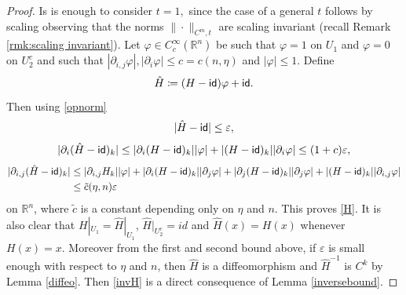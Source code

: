 \documentclass[11pt]{article}
\newcommand{\eps}{\varepsilon}
\newcommand{\rr}{\mathbb{R}}
\newcommand{\id}{{\sf id}}
\renewcommand{\phi}{\varphi}
\theoremstyle{plain}
\theoremstyle{definition}
\numberwithin{equation}{section}
\begin{document}
\begin{proof}
		Is is enough to  consider $t=1,$ since the case of a general $t$ follows by scaling observing that the norms $\|\cdot\|_{C^m,t}$ are scaling invariant (recall Remark \ref{rmk:scaling invariant}).
	Let  $\phi \in C_c^{\infty}(\rr^n)$ be such that $\phi=1 $ on $U_1$ and $\phi=0$ on $U_2^c$ and such that $|\partial_{i,j}\phi|,|\partial_i\phi |\le c=c(n,\eta)$ and $|\phi|\le 1$. Define 
	\[\hat H\coloneqq  (H-{\sf{id}})\phi+\id. \]
	Then using \eqref{opnorm}
	$$|\hat H-\id|\le \eps, $$
	$$|\partial_i(\hat H-{\sf{id}})_k|\le |\partial_i (H-{\sf{id}})_k||\phi|+|(H-{\sf{id}})_k| |\partial_i \phi  |\le (1+c) \eps, $$
	\begin{align*}
		|\partial_{i,j}(\hat H-{\sf{id}})_k|&\le  |\partial_{i,j} H_k||\phi|+|\partial_{i}(H-{\sf{id}})_k||\partial_j\phi |+|\partial_{j}(H-{\sf{id}})_k||\partial_j\phi |+|(H-{\sf{id}})_k||\partial_{i,j} \phi|\\
		&\le \tilde c(\eta,n) \eps 
	\end{align*}
	on $\rr^n$, where $\tilde c$ is a constant depending only on $\eta$ and $n$. This proves \eqref{H}. It is also clear that $H|_{U_1}=\hat H|_{U_1}$, $\hat H|_{U_2^c}=id$ and $\hat H(x)=H(x)$ whenever $H(x)=x$. Moreover from the first and second bound above, if $\eps$ is small enough with respect to $\eta$ and $n$, then $\hat H$ is a diffeomorphism and $\hat H^{-1}$ is $C^k$ by Lemma \ref{diffeo}.   Then \eqref{invH} is a direct consequence of Lemma \ref{inversebound}.
\end{proof}
\end{document}
